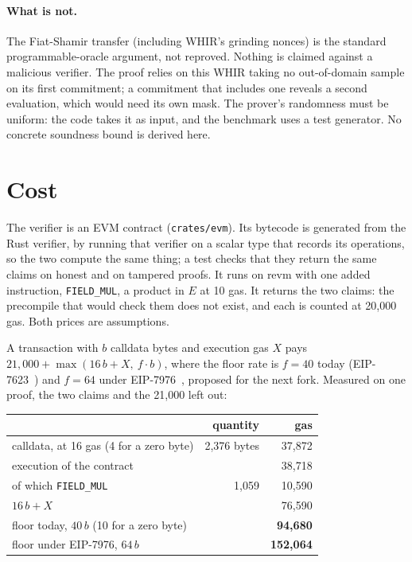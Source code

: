 \documentclass[11pt]{article}
\newcommand{\E}{E}
\newcommand{\code}[1]{\texttt{#1}}
\begin{document}
\paragraph{What is not.} The Fiat-Shamir transfer (including WHIR's grinding nonces) is the standard programmable-oracle argument, not reproved. Nothing is claimed against a malicious verifier. The proof relies on this WHIR taking no out-of-domain sample on its first commitment; a commitment that includes one reveals a second evaluation, which would need its own mask. The prover's randomness must be uniform: the code takes it as input, and the benchmark uses a test generator. No concrete soundness bound is derived here.

\section{Cost}\label{sec:cost}

The verifier is an EVM contract (\code{crates/evm}). Its bytecode is generated from the Rust verifier, by running that verifier on a scalar type that records its operations, so the two compute the same thing; a test checks that they return the same claims on honest and on tampered proofs. It runs on revm with one added instruction, \code{FIELD\_MUL}, a product in $\E$ at 10 gas. It returns the two claims: the precompile that would check them does not exist, and each is counted at 20{,}000 gas. Both prices are assumptions.

A transaction with $b$ calldata bytes and execution gas $X$ pays $21{,}000 + \max(16\, b + X,\ f \cdot b)$, where the floor rate is $f = 40$ today (EIP-7623~\cite{EIP7623}) and $f = 64$ under EIP-7976~\cite{EIP7976}, proposed for the next fork. Measured on one proof, the two claims and the 21{,}000 left out:

\begin{center}
\begin{tabular}{@{}lrr@{}}
\toprule
 & quantity & gas \\
\midrule
calldata, at 16 gas (4 for a zero byte) & 2{,}376 bytes & 37{,}872 \\
execution of the contract & & 38{,}718 \\
\quad of which \code{FIELD\_MUL} & 1{,}059 & 10{,}590 \\
\midrule
$16\, b + X$ & & 76{,}590 \\
floor today, $40\, b$ (10 for a zero byte) & & \textbf{94{,}680} \\
floor under EIP-7976, $64\, b$ & & \textbf{152{,}064} \\
\bottomrule
\end{tabular}
\end{center}
\end{document}
